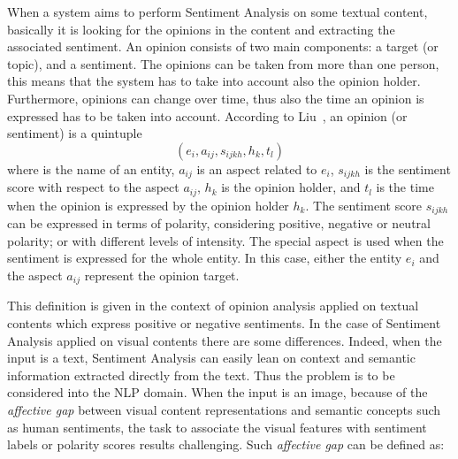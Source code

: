 When a system aims to perform Sentiment Analysis on some textual content, basically it is looking for the opinions in the content and extracting the associated sentiment. An opinion consists of two main components: a target (or topic), and a sentiment. The opinions can be taken from more than one person, this means that the system has to take into account also the opinion holder. Furthermore, opinions can change over time, thus also the time an opinion is expressed has to be taken into account.
According to Liu~\cite{liu2012sentiment}, an opinion (or sentiment) is a quintuple 
\begin{equation}
\left( e_i, a_{ij}, s_{ijkh}, h_k, t_l \right) 
\end{equation}
where  is the name of an entity, $a_{ij}$ is an aspect related to $e_i$, $s_{ijkh}$ is the sentiment score with respect to the aspect $a_{ij}$, $h_k$ is the opinion holder, and $t_l$ is the time when the opinion is expressed by the opinion holder $h_k$.
The sentiment score $s_{ijkh}$ can be expressed in terms of polarity, considering positive, negative or neutral polarity; or with different levels of intensity. %
The special aspect  is used when the sentiment is expressed for the whole entity. In this case, either the entity $e_{i}$ and the aspect $a_{ij}$ represent the opinion target. 

This definition is given in the context of opinion analysis applied on textual contents which express positive or negative sentiments.
In the case of Sentiment Analysis applied on visual contents there are some differences. Indeed, when the input is a text, Sentiment Analysis can easily lean on context and semantic information extracted directly from the text. Thus the problem is to be considered into the NLP domain. %
When the input is an image, because of the \textit{affective gap} between visual content representations and semantic concepts such as human sentiments, the task to associate the visual features with sentiment labels or polarity scores results challenging.
Such \textit{affective gap} can be defined as: 
\\

